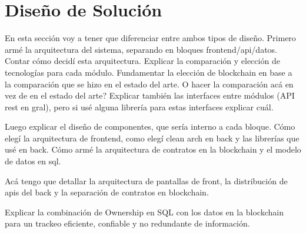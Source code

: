 \chapter[Diseño de Solución]{Diseño de Solución}
\label{cp:design}

\parindent0pt

En esta sección voy a tener que diferenciar entre ambos tipos de diseño. Primero armé la arquitectura del sistema, separando en bloques frontend/api/datos. Contar cómo decidí esta arquitectura. Explicar  la comparación y elección de tecnologías para cada módulo. Fundamentar la elección de blockchain en base a la comparación que se hizo en el estado del arte. O hacer la comparación acá en vez de en el estado del arte?
Explicar también las interfaces entre módulos (API rest en gral), pero si usé alguna librería para estas interfaces explicar cuál.

Luego explicar el diseño de componentes, que sería interno a cada bloque. Cómo elegí la arquitectura de frontend, como elegí clean arch en back y las librerías que usé en back. Cómo armé la arquitectura de contratos en la blockchain y el modelo de datos en sql. 

Acá tengo que detallar la arquitectura de pantallas de front, la distribución de apis del back y la separación de contratos en blockchain.

Explicar la combinación de Ownership en SQL con los datos en la blockchain para un trackeo eficiente, confiable y no redundante de información.
